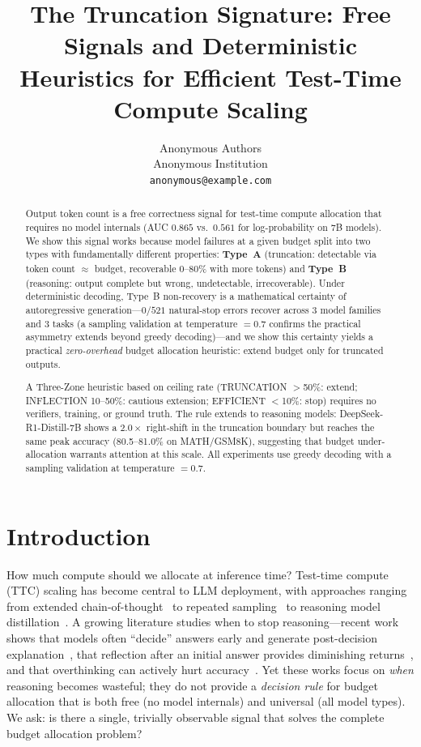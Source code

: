 \documentclass{article}
\title{The Truncation Signature: Free Signals and Deterministic Heuristics for Efficient Test-Time Compute Scaling}
\author{
  Anonymous Authors \\
  Anonymous Institution \\
  \texttt{anonymous@example.com}
}
\begin{document}
\maketitle

\begin{abstract}
Output token count is a free correctness signal for test-time compute allocation that requires no model internals (AUC $0.865$ vs.\ $0.561$ for log-probability on 7B models). We show this signal works because model failures at a given budget split into two types with fundamentally different properties: \textbf{Type~A} (truncation: detectable via token count $\approx$ budget, recoverable 0--80\% with more tokens) and \textbf{Type~B} (reasoning: output complete but wrong, undetectable, irrecoverable). Under deterministic decoding, Type~B non-recovery is a mathematical certainty of autoregressive generation---$0/521$ natural-stop errors recover across 3 model families and 3 tasks (a sampling validation at temperature $= 0.7$ confirms the practical asymmetry extends beyond greedy decoding)---and we show this certainty yields a practical \emph{zero-overhead} budget allocation heuristic: extend budget only for truncated outputs.

A Three-Zone heuristic based on ceiling rate (TRUNCATION $>$50\%: extend; INFLECTION 10--50\%: cautious extension; EFFICIENT $<$10\%: stop) requires no verifiers, training, or ground truth. The rule extends to reasoning models: DeepSeek-R1-Distill-7B shows a $2.0\times$ right-shift in the truncation boundary but reaches the same peak accuracy (80.5--81.0\% on MATH/GSM8K), suggesting that budget under-allocation warrants attention at this scale. All experiments use greedy decoding with a sampling validation at temperature $= 0.7$.
\end{abstract}

\section{Introduction}

How much compute should we allocate at inference time? Test-time compute (TTC) scaling has become central to LLM deployment, with approaches ranging from extended chain-of-thought~\cite{wei2022chain} to repeated sampling~\cite{brown2024large,snell2024scaling} to reasoning model distillation~\cite{guo2025deepseek}. A growing literature studies when to stop reasoning---recent work shows that models often ``decide'' answers early and generate post-decision explanation~\cite{decideearly2026}, that reflection after an initial answer provides diminishing returns~\cite{firsttry2025}, and that overthinking can actively hurt accuracy~\cite{morethinkinghurts2026}. Yet these works focus on \emph{when} reasoning becomes wasteful; they do not provide a \emph{decision rule} for budget allocation that is both free (no model internals) and universal (all model types). We ask: is there a single, trivially observable signal that solves the complete budget allocation problem?
\end{document}
